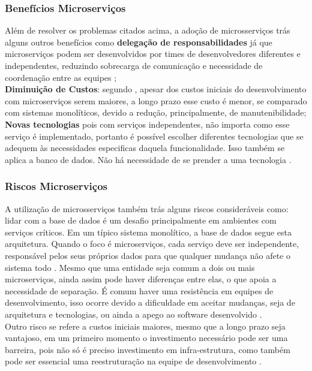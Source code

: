 \documentclass[12pt]{article}
\begin{document}
\subsubsection{Benefícios Microserviços}
Além de resolver os problemas citados acima, a adoção de microsserviços trás alguns outros benefícios como \textbf{delegação de responsabilidades} já que microserviços podem ser desenvolvidos por times de desenvolvedores diferentes e independentes, reduzindo sobrecarga de comunicação e necessidade de coordenação entre as equipes \cite{Taibi}; 
\\
\textbf{Diminuição de Custos}: segundo \cite{Taibi}, apesar dos custos iniciais do desenvolvimento com microserviços serem maiores, a longo prazo esse custo é menor, se comparado com sistemas monolíticos, devido a redução, principalmente, de manutenibilidade; 
\\
\textbf{Novas tecnologias} pois com serviços independentes, não importa como esse serviço é implementado, portanto é possível escolher diferentes tecnologias que se adequem às necessidades especificas daquela funcionalidade. Isso também se aplica a banco de dados. Não há necessidade de se prender a uma tecnologia \cite{Richter2017a}. 


\subsubsection{Riscos Microserviços}
A utilização de microsserviços também trás alguns riscos consideráveis como: lidar com a base de dados é um desafio principalmente em ambientes com serviços críticos. Em um típico sistema monolítico, a base de dados segue esta arquitetura. Quando o foco é microserviços, cada serviço deve ser independente, responsável pelos seus próprios dados para que qualquer mudança não afete o sistema todo \cite{Kholy2019}. Mesmo que uma entidade seja comum a dois ou mais microserviços, ainda assim pode haver diferenças entre elas, o que apoia a necessidade de separação. É comum haver uma resistência em equipes de desenvolvimento, isso ocorre devido a dificuldade em aceitar mudanças, seja de arquitetura e tecnologias, ou ainda a apego ao software desenvolvido \cite{Taibi}. 
\\Outro risco se refere a custos iniciais maiores, mesmo que a longo prazo seja vantajoso, em um primeiro momento o investimento necessário pode ser uma barreira, pois não só é preciso investimento em infra-estrutura, como também pode ser essencial uma reestruturação na equipe de desenvolvimento \cite{Taibi}.
\end{document}
